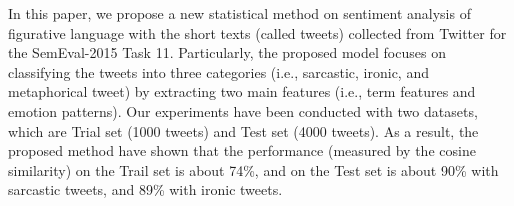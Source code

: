 In this paper, we propose a new statistical method on sentiment analysis of figurative language with the short texts (called tweets) collected from Twitter for the SemEval-2015 Task 11. Particularly, the proposed model focuses on classifying the tweets into three categories (i.e., sarcastic, ironic, and metaphorical tweet) by extracting two main features (i.e., term features and emotion patterns). Our experiments have been conducted with two datasets, which are Trial set (1000 tweets) and Test set (4000 tweets). As a result, the proposed method have shown that the performance (measured by the cosine similarity) on the Trail set is about 74\%, and on the Test set is about 90\% with sarcastic tweets, and 89\% with ironic tweets.
